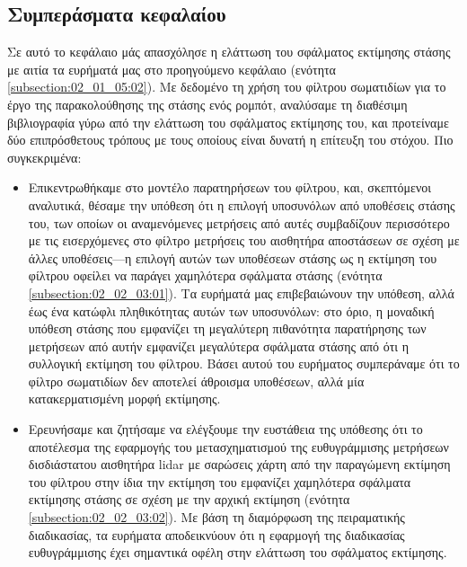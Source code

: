 \subsection{Συμπεράσματα κεφαλαίου}
\label{subsection:02_02_05:01}

Σε αυτό το κεφάλαιο μάς απασχόλησε η ελάττωση του σφάλματος εκτίμησης στάσης
με αιτία τα ευρήματά μας στο προηγούμενο κεφάλαιο
(ενότητα \ref{subsection:02_01_05:02}). Με δεδομένο τη χρήση του φίλτρου
σωματιδίων για το έργο της παρακολούθησης της στάσης ενός ρομπότ, αναλύσαμε τη
διαθέσιμη βιβλιογραφία γύρω από την ελάττωση του σφάλματος εκτίμησης του, και
προτείναμε δύο επιπρόσθετους τρόπους με τους οποίους είναι δυνατή η επίτευξη
του στόχου. Πιο συγκεκριμένα:

\begin{itemize}
  \item Επικεντρωθήκαμε στο μοντέλο παρατηρήσεων του φίλτρου, και, σκεπτόμενοι
        αναλυτικά, θέσαμε την υπόθεση ότι η επιλογή υποσυνόλων από υποθέσεις
        στάσης του, των οποίων οι αναμενόμενες μετρήσεις από αυτές συμβαδίζουν
        περισσότερο με τις εισερχόμενες στο φίλτρο μετρήσεις του αισθητήρα
        αποστάσεων σε σχέση με άλλες υποθέσεις---η επιλογή αυτών των υποθέσεων
        στάσης ως η εκτίμηση του φίλτρου οφείλει να παράγει χαμηλότερα σφάλματα
        στάσης (ενότητα \ref{subsection:02_02_03:01}). Τα ευρήματά μας
        επιβεβαιώνουν την υπόθεση, αλλά έως ένα κατώφλι πληθικότητας αυτών των
        υποσυνόλων: στο όριο, η μοναδική υπόθεση στάσης που εμφανίζει τη
        μεγαλύτερη πιθανότητα παρατήρησης των μετρήσεων από αυτήν εμφανίζει
        μεγαλύτερα σφάλματα στάσης από ότι η συλλογική εκτίμηση του φίλτρου.
        Βάσει αυτού του ευρήματος συμπεράναμε ότι το φίλτρο σωματιδίων δεν
        αποτελεί άθροισμα υποθέσεων, αλλά μία κατακερματισμένη μορφή εκτίμησης.
  \item Ερευνήσαμε και ζητήσαμε να ελέγξουμε την ευστάθεια της υπόθεσης ότι
        το αποτέλεσμα της εφαρμογής του μετασχηματισμού της ευθυγράμμισης
        μετρήσεων δισδιάστατου αισθητήρα lidar με σαρώσεις χάρτη από την
        παραγώμενη εκτίμηση του φίλτρου στην ίδια την εκτίμηση του εμφανίζει
        χαμηλότερα σφάλματα εκτίμησης στάσης σε σχέση με την αρχική εκτίμηση
        (ενότητα \ref{subsection:02_02_03:02}). Με βάση τη διαμόρφωση της
        πειραματικής διαδικασίας, τα ευρήματα αποδεικνύουν ότι η εφαρμογή της
        διαδικασίας ευθυγράμμισης έχει σημαντικά οφέλη στην ελάττωση του
        σφάλματος εκτίμησης.

\end{itemize}
